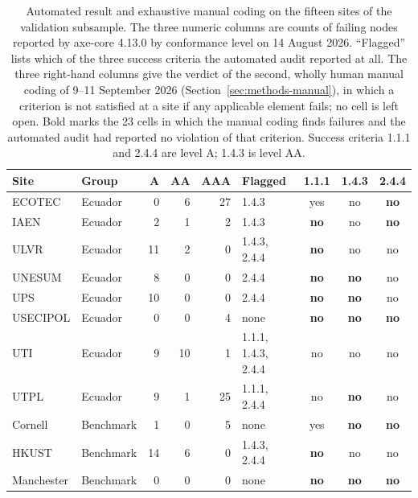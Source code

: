 \documentclass[]{interact}
\begin{document}
\begin{table}[htbp]
	\centering
	\caption{Automated result and exhaustive manual coding on the fifteen sites of the validation subsample. The three numeric columns are counts of failing nodes reported by axe-core 4.13.0 by conformance level on 14 August 2026. ``Flagged'' lists which of the three success criteria the automated audit reported at all. The three right-hand columns give the verdict of the second, wholly human manual coding of 9--11 September 2026 (Section~\ref{sec:methods-manual}), in which a criterion is not satisfied at a site if any applicable element fails; no cell is left open. Bold marks the 23 cells in which the manual coding finds failures and the automated audit had reported no violation of that criterion. Success criteria 1.1.1 and 2.4.4 are level A; 1.4.3 is level AA.}\label{tab:manual}
	\footnotesize\setlength{\tabcolsep}{4pt}
	\begin{tabular}{llrrrlccc}
		\toprule
		Site & Group & A & AA & AAA & Flagged & 1.1.1 & 1.4.3 & 2.4.4 \\
		\midrule
		ECOTEC       & Ecuador &  0 &  6 & 27 & 1.4.3               & yes         & no          & \textbf{no} \\
		IAEN         & Ecuador &  2 &  1 &  2 & 1.4.3               & \textbf{no} & no          & \textbf{no} \\
		ULVR         & Ecuador & 11 &  2 &  0 & 1.4.3, 2.4.4        & \textbf{no} & no          & no          \\
		UNESUM       & Ecuador &  8 &  0 &  0 & 2.4.4               & \textbf{no} & \textbf{no} & no          \\
		UPS          & Ecuador & 10 &  0 &  0 & 2.4.4               & \textbf{no} & \textbf{no} & no          \\
		USECIPOL     & Ecuador &  0 &  0 &  4 & none                & \textbf{no} & \textbf{no} & \textbf{no} \\
		UTI          & Ecuador &  9 & 10 &  1 & 1.1.1, 1.4.3, 2.4.4 & no          & no          & no          \\
		UTPL         & Ecuador &  9 &  1 & 25 & 1.1.1, 2.4.4        & no          & \textbf{no} & no          \\
		\midrule
		Cornell      & Benchmark &  1 &  0 &  5 & none                & yes         & \textbf{no} & \textbf{no} \\
		HKUST        & Benchmark & 14 &  6 &  0 & 1.4.3, 2.4.4        & \textbf{no} & no          & no          \\
		Manchester   & Benchmark &  0 &  0 &  0 & none                & \textbf{no} & \textbf{no} & \textbf{no} \\

\end{tabular}
\end{table}
\end{document}
